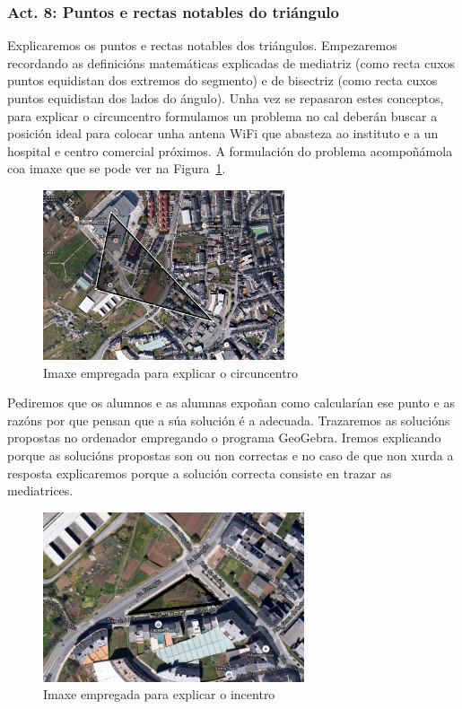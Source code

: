 \subsubsection{Act. 8: Puntos e rectas notables do triángulo}\label{act:rectasnotables}
Explicaremos os puntos e rectas notables dos triángulos. Empezaremos recordando as definicións matemáticas explicadas de mediatriz (como recta cuxos puntos equidistan dos extremos do segmento) e de bisectriz (como recta cuxos puntos equidistan dos lados do ángulo). Unha vez se repasaron estes conceptos, para explicar o circuncentro formulamos un problema no cal deberán buscar a posición ideal para colocar unha antena WiFi que abasteza ao instituto e a un hospital e centro comercial próximos. A formulación do problema acompoñámola coa imaxe que se pode ver na Figura~\ref{fig:act12-1}.

\begin{figure}[h!]
  \centering
  \includegraphics[height=5cm]{img/circuncentro.png}
  \caption{Imaxe empregada para explicar o circuncentro}\label{fig:act12-1}
\end{figure}

Pediremos que os alumnos e as alumnas expoñan como calcularían ese punto e as razóns por que pensan que a súa solución é a adecuada. Trazaremos as solucións propostas no ordenador empregando o programa GeoGebra. Iremos explicando porque as solucións propostas son ou non correctas e no caso de que non xurda a resposta explicaremos porque a solución correcta consiste en trazar as mediatrices.

\begin{figure}[h!]
  \centering
  \includegraphics[height=5cm]{img/incentro.png}
  \caption{Imaxe empregada para explicar o incentro}\label{fig:act12-2}
\end{figure}


